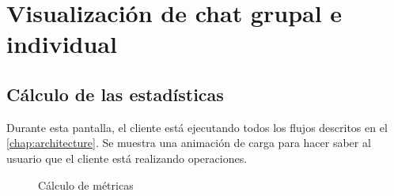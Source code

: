 \section{Visualización de chat grupal e individual}

\subsection{Cálculo de las estadísticas}

Durante esta pantalla, el cliente está ejecutando todos los flujos descritos en el \autoref{chap:architecture}. Se muestra una animación de carga para hacer saber al usuario que el cliente está realizando operaciones.

\begin{figure}[H]
	\centering
	\qquad
	\caption{Cálculo de métricas}
	\label{fig:chap5:calc}
\end{figure}



